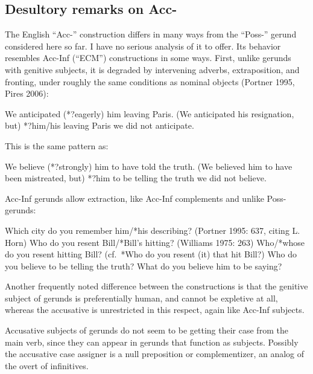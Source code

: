 \documentclass[output=paper,
modfonts
]{LSP/langsci}
\begin{document}
\subsection{Desultory remarks on Acc-}
\label{accing}
The English ``Acc-'' construction differs in many ways from the
``Poss-'' gerund considered here so far.  I have no serious analysis of it to
offer.  Its behavior resembles Acc-Inf (``ECM'') constructions in some ways.
First, unlike gerunds with genitive subjects, it is degraded by intervening adverbs,
extraposition, and fronting, under roughly the same conditions as nominal objects (Portner
1995, Pires 2006):
\begin{exe}
\ex\label{separation}
	\ea We anticipated (*?eagerly) him leaving Paris.
	\ex (We anticipated his resignation, but) *?him/his leaving Paris we did not anticipate.
	\z  
\end{exe}
This is the same pattern as:
\begin{exe}
\ex\label{separationa}
	\ea We believe (*?strongly) him to have told the truth. 
	\ex (We believed him to have been mistreated, but) *?him to be telling the truth we did not believe.
	\z    
\end{exe}


Acc-Inf gerunds allow extraction,  like Acc-Inf complements and  unlike Poss- gerunds:
\begin{exe}
\ex
	\ea Which city do you remember him/*his describing? (Portner 1995: 637, citing L. Horn)
	\ex Who do you resent Bill/*Bill's hitting?  (Williams 1975: 263)
	\ex Who/*whose do you resent hitting Bill?  (cf.\ *Who do you resent (it) that hit Bill?)
	\ex Who do you believe to be telling the truth?
	\ex What do you believe him to be saying?
	\z    
\end{exe}
Another frequently noted difference between the constructions is that the genitive subject of
gerunds is preferentially human, and cannot be expletive  at all, whereas the
accusative is unrestricted in this respect, again like Acc-Inf subjects.
Accusative subjects of gerunds do not seem to be getting their case from the main verb, since
they can appear in gerunds that function as subjects.  Possibly the accusative case assigner is
a null preposition or complementizer, an analog of the overt  of 
infinitives. 
\end{document}
